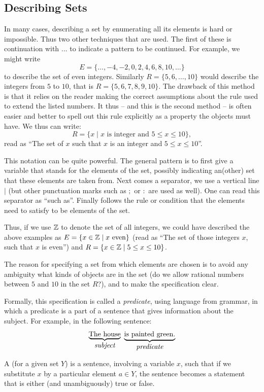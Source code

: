\subsection{Describing Sets}

In many cases, describing a set by enumerating all its elements is
hard or impossible. Thus two other techniques that are used. The first of
these is continuation with
$\ldots$ to indicate a pattern to be continued. For example, we might write
\[
E=\{\ldots,-4,-2,0,2,4,6,8,10,\ldots\}
\]
to describe the set of even integers. Similarly
$R=\{5,6,\ldots,10\}$ would describe the integers from $5$ to $10$, that is
$R=\{5,6,7,8,9,10\}$. The drawback of this method is that it relies on the
reader making the correct assumptions about the rule used to extend the
listed numbers. It thus -- and this is the second method -- is often easier
and better to spell out this rule explicitly as a property the objects must
have. We thus can write:
\[
R=\{x\mid \mbox{$x$ is integer and $5\le x\le 10$}\},
\]
read as ``The set of $x$ such that $x$ is an integer and $5\le x\le 10$''.

This notation can be quite powerful. The general pattern is to first
give a variable that stands for the elements of the set, possibly indicating
an(other) set that these elements are taken from. Next comes a separator,
we use a vertical line $\mid$ (but other punctuation marks such as $;$ or
$:$ are used as well). One can read this separator as ``such as''.
Finally follows the rule or condition that the elements need to satisfy to
be elements of the set.

Thus, if we use ${\mathbb Z}$ to denote the set of all integers, we could have
described the above examples as
$E=\{x\in{\mathbb Z}\mid \mbox{$x$ even}\}$ (read as ``The set of those integers $x$,
such that $x$ is even'') and $R=\{x\in{\mathbb Z}\mid 5\le x\le 10\}$.

The reason for specifying a set from which elements are chosen is to avoid
any ambiguity what kinds of objects are in the set (do we allow rational
numbers between $5$ and $10$ in the set $R$?), and to make the specification
clear.

Formally, this specification is called a {\em predicate}, using language from
grammar, in which a predicate is a part of a sentence that gives information
about the subject. For example, in the following sentence:
\[
\underbrace{\mbox{The house}}_{\mbox{{\em subject}}}\ 
\underbrace{\mbox{is painted green.}}_{\mbox{{\em predicate}}}
\]
\begin{defn}
A  (for a given set $Y$) is a sentence, involving a
variable $x$, such that if we substitute $x$ by a particular element $a\in
Y$, the sentence becomes a statement that is either (and unambiguously)
true or false.
\end{defn}

